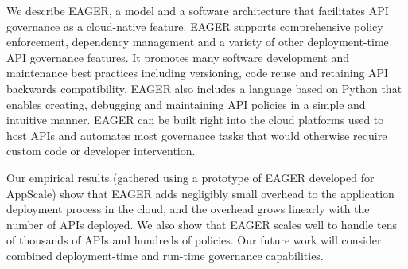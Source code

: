 
We describe EAGER, a model and a software architecture that facilitates API
governance as a cloud-native feature. EAGER supports comprehensive policy
enforcement, dependency management and a variety of other deployment-time API
governance features. It promotes many software development and maintenance
best practices including versioning, code reuse and retaining API backwards
compatibility. EAGER also includes a language based on Python that enables
creating, debugging and maintaining API policies in a simple and intuitive
manner. EAGER can be built right into the cloud platforms used to host APIs
and automates most governance tasks that would otherwise require custom code
or developer intervention.

Our empirical results (gathered using a prototype of EAGER developed for
AppScale)
show that EAGER adds negligibly small overhead to the application deployment process in the cloud, and the overhead grows linearly
with the number of APIs deployed. We also show that EAGER scales well to handle tens of thousands of APIs and hundreds of policies. 
Our future work will consider combined deployment-time and run-time
governance capabilities.
